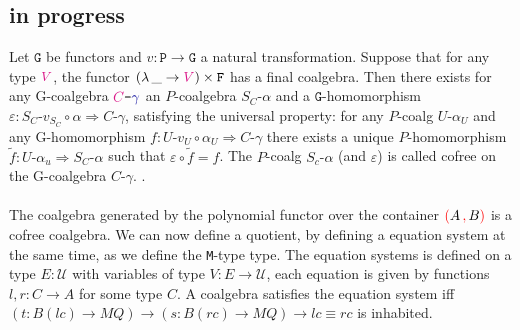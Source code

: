 \documentclass[twoside,11pt,openright]{report}
\theoremstyle{plain} %
\theoremstyle{definition}
\theoremstyle{remark}
\newcommand*{\type}[1]{\textcolor{magenta!90!black}{#1}}
\newcommand*{\containerpair}[2]{\textcolor{red}{(}#1\,\textcolor{red}{,}\,#2\textcolor{red}{)}}
\newcommand*{\coalg}[2]{#1\texttt{-}#2}
\newcommand*{\function}[1]{\textcolor{blue!60!black}{\ensuremath{\mathtt{#1}}}}
\newcommand*{\functor}[1]{\ensuremath{\mathbf{\mathtt{#1}}}}
\begin{document}
\subsection{in progress}
Let \(\functor{G}\) be functors and \(v : \functor{P} \rightarrow \functor{G}\) a natural transformation. Suppose that for any type \(\type{V}\), the functor \((\lambda\,\_ \rightarrow \type{V}) \times\functor{F}\) has a final coalgebra. Then there exists for any G-coalgebra \(\coalg{\type{C}}{\function{\gamma}}\) an \(P\)-coalgebra \(\coalg{S_C}{\alpha}\) and a \(\functor{G}\)-homomorphism \(\varepsilon:\coalg{S_C}{v_{S_C} \circ \alpha} \Rightarrow \coalg{C}{\gamma}\), satisfying the universal property: for any \(P\)-coalg \(\coalg{U}{\alpha_U}\) and any G-homomorphism \(f : \coalg{U}{v_U \circ \alpha_U} \Rightarrow \coalg{C}{\gamma}\) there exists a unique \(P\)-homomorphism \(\tilde{f} : \coalg{U}{\alpha_u} \Rightarrow \coalg{S_C}{\alpha}\) such that \(\varepsilon \circ \tilde{f} = f\). The \(P\)-coalg \(\coalg{S_c}{\alpha}\) (and \(\varepsilon\)) is called cofree on the G-coalgebra \(\coalg{C}{\gamma}\). \cite[theorem 17.1]{UniversalCoalgebra}.
\\ \\
The coalgebra generated by the polynomial functor over the container \(\containerpair{A}{B}\) is a cofree coalgebra. We can now define a quotient, by defining a equation system at the same time, as we define the \texttt{M}-type type. The equation systems is defined on a type \(E : \mathcal{U}\) with variables of type \(V : E \rightarrow \mathcal{U}\), each equation is given by functions \(l,r : C \rightarrow A\) for some type \(C\). A coalgebra satisfies the equation system iff \((t : B (l c) \rightarrow MQ) \rightarrow (s : B (r c) \rightarrow MQ) \rightarrow l c \equiv r c\) is inhabited.
\end{document}
